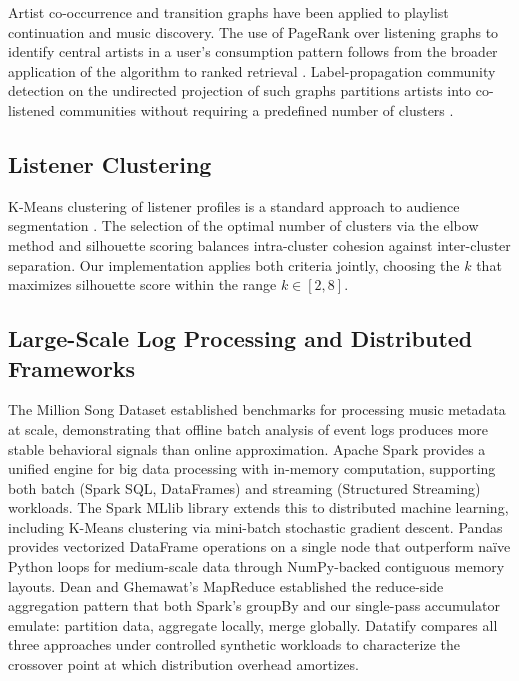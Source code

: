\documentclass[conference]{IEEEtran}
\begin{document}
Artist co-occurrence and transition graphs have been applied to playlist
continuation \cite{chen2012playlist} and music discovery. The use of PageRank
over listening graphs to identify central artists in a user's consumption
pattern follows from the broader application of the algorithm to ranked
retrieval \cite{page1999pagerank}. Label-propagation community detection on
the undirected projection of such graphs partitions artists into co-listened
communities without requiring a predefined number of clusters
\cite{raghavan2007near}.

\subsection{Listener Clustering}

K-Means clustering of listener profiles is a standard approach to audience
segmentation \cite{mcqueen1967methods}. The selection of the optimal number of
clusters via the elbow method and silhouette scoring \cite{rousseeuw1987silhouettes}
balances intra-cluster cohesion against inter-cluster separation. Our
implementation applies both criteria jointly, choosing the $k$ that maximizes
silhouette score within the range $k \in [2, 8]$.

\subsection{Large-Scale Log Processing and Distributed Frameworks}

The Million Song Dataset \cite{bertin2011million} established benchmarks for
processing music metadata at scale, demonstrating that offline batch analysis
of event logs produces more stable behavioral signals than online approximation.
Apache Spark \cite{zaharia2016apache} provides a unified engine for big data
processing with in-memory computation, supporting both batch (Spark SQL,
DataFrames) and streaming (Structured Streaming) workloads. The Spark MLlib
library extends this to distributed machine learning, including K-Means
clustering via mini-batch stochastic gradient descent. Pandas \cite{mckinney2010data}
provides vectorized DataFrame operations on a single node that outperform
naïve Python loops for medium-scale data through NumPy-backed contiguous
memory layouts. Dean and Ghemawat's MapReduce \cite{dean2008mapreduce}
established the reduce-side aggregation pattern that both Spark's groupBy
and our single-pass accumulator emulate: partition data, aggregate locally,
merge globally. Datatify compares all three approaches under controlled
synthetic workloads to characterize the crossover point at which distribution
overhead amortizes.
\end{document}
